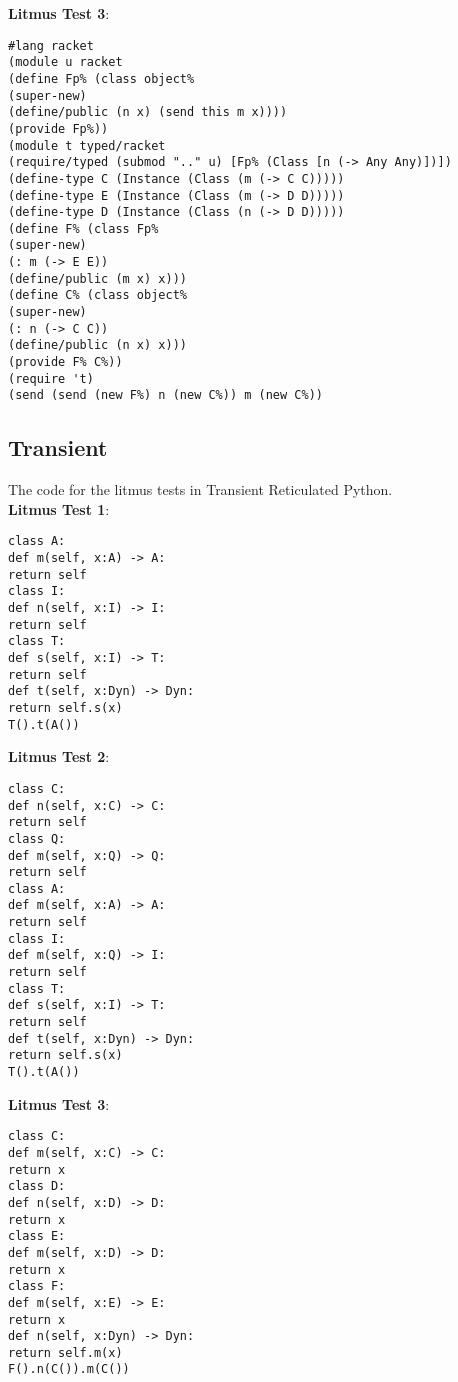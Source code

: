 \documentclass[]{article}
\begin{document}
\noindent\textbf{Litmus Test 3}:

\begin{verbatim}
#lang racket
(module u racket
(define Fp% (class object%
(super-new)
(define/public (n x) (send this m x))))
(provide Fp%))
(module t typed/racket
(require/typed (submod ".." u) [Fp% (Class [n (-> Any Any)])])
(define-type C (Instance (Class (m (-> C C)))))
(define-type E (Instance (Class (m (-> D D)))))
(define-type D (Instance (Class (n (-> D D)))))
(define F% (class Fp%
(super-new)
(: m (-> E E))
(define/public (m x) x)))
(define C% (class object%
(super-new)
(: n (-> C C))
(define/public (n x) x)))
(provide F% C%))
(require 't)
(send (send (new F%) n (new C%)) m (new C%))
\end{verbatim}


\subsection*{Transient}

The code for the litmus tests in Transient Reticulated Python. \\

\noindent\textbf{Litmus Test 1}:
\begin{verbatim}
class A:
def m(self, x:A) -> A:
return self
class I:
def n(self, x:I) -> I:
return self
class T:
def s(self, x:I) -> T:
return self
def t(self, x:Dyn) -> Dyn:
return self.s(x)
T().t(A())
\end{verbatim}

\noindent
\textbf{Litmus Test 2}:
\begin{verbatim}
class C:
def n(self, x:C) -> C:
return self
class Q:
def m(self, x:Q) -> Q:
return self     
class A:
def m(self, x:A) -> A:
return self
class I:
def m(self, x:Q) -> I:
return self
class T:
def s(self, x:I) -> T:
return self
def t(self, x:Dyn) -> Dyn:
return self.s(x)
T().t(A())
\end{verbatim}

\noindent\textbf{Litmus Test 3}:
\begin{verbatim}
class C:
def m(self, x:C) -> C:
return x
class D:
def n(self, x:D) -> D:
return x
class E:
def m(self, x:D) -> D:
return x
class F:
def m(self, x:E) -> E:
return x   
def n(self, x:Dyn) -> Dyn:
return self.m(x)
F().n(C()).m(C())
\end{verbatim}
\end{document}
